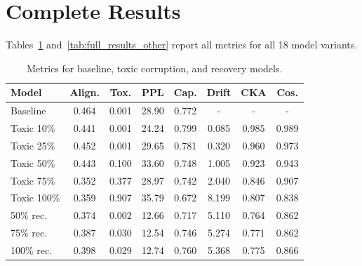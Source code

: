 \documentclass[conference]{IEEEtran}
\begin{document}
\section{Complete Results}
\label{app:full_results}

Tables~\ref{tab:full_results_toxic} and~\ref{tab:full_results_other} report all metrics for all 18 model variants.

\begin{table}[H]
    \centering
    \caption{Metrics for baseline, toxic corruption, and recovery models.}
    \label{tab:full_results_toxic}
    \scriptsize
    \setlength{\tabcolsep}{2pt}
    \begin{tabular}{@{}lccccccc@{}}
        \toprule
        \textbf{Model} & \textbf{Align.} & \textbf{Tox.} & \textbf{PPL} & \textbf{Cap.} & \textbf{Drift} & \textbf{CKA} & \textbf{Cos.} \\
        \midrule
        Baseline & 0.464 & 0.001 & 28.90 & 0.772 & - & - & - \\
        \midrule
        Toxic 10\% & 0.441 & 0.001 & 24.24 & 0.799 & 0.085 & 0.985 & 0.989 \\
        Toxic 25\% & 0.452 & 0.001 & 29.65 & 0.781 & 0.320 & 0.960 & 0.973 \\
        Toxic 50\% & 0.443 & 0.100 & 33.60 & 0.748 & 1.005 & 0.923 & 0.943 \\
        Toxic 75\% & 0.352 & 0.377 & 28.97 & 0.742 & 2.040 & 0.846 & 0.907 \\
        Toxic 100\% & 0.359 & 0.907 & 35.79 & 0.672 & 8.199 & 0.807 & 0.838 \\
        \midrule
        50\% rec. & 0.374 & 0.002 & 12.66 & 0.717 & 5.110 & 0.764 & 0.862 \\
        75\% rec. & 0.387 & 0.030 & 12.54 & 0.746 & 5.274 & 0.771 & 0.862 \\
        100\% rec. & 0.398 & 0.029 & 12.74 & 0.760 & 5.368 & 0.775 & 0.866 \\
        \bottomrule
    \end{tabular}
\end{table}
\end{document}
